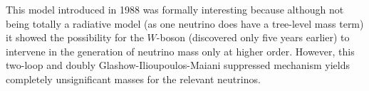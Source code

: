 This model introduced in 1988 \cite{babu_ma_phyrev} was formally interesting because although not being totally a radiative model (as one neutrino does have a tree-level mass term) it showed the possibility for the $W$-boson (discovered only five years earlier) to intervene in the generation of neutrino mass only at higher order. However, this two-loop and doubly Glashow-Ilioupoulos-Maiani suppressed mechanism yields completely unsignificant masses for the relevant neutrinos.








